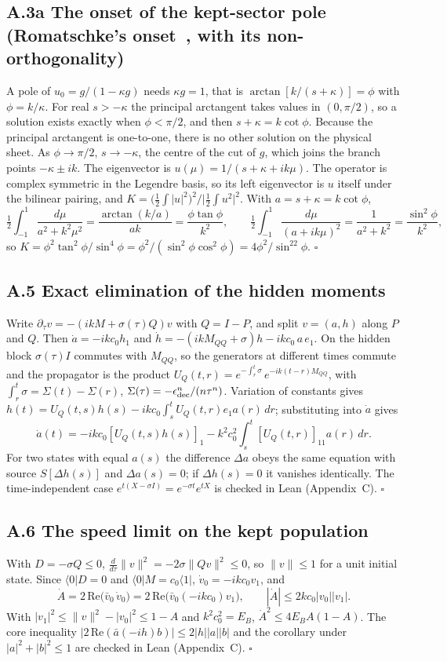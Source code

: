 \documentclass[11pt]{article}
\begin{document}
\subsection*{A.3a The onset of the kept-sector pole (Romatschke's onset~\cite[Eq.~(37)]{Rom}, with its non-orthogonality)}
A pole of $u_0=g/(1-\kappa g)$ needs $\kappa g=1$, that is $\arctan[k/(s+\kappa)]=\phi$ with $\phi=k/\kappa$. For real $s>-\kappa$ the principal arctangent takes values in $(0,\pi/2)$, so a solution exists exactly when $\phi<\pi/2$, and then $s+\kappa=k\cot\phi$. Because the principal arctangent is one-to-one, there is no other solution on the physical sheet. As $\phi\to\pi/2$, $s\to-\kappa$, the centre of the cut of $g$, which joins the branch points $-\kappa\pm ik$. The eigenvector is $u(\mu)=1/(s+\kappa+ik\mu)$. The operator is complex symmetric in the Legendre basis, so its left eigenvector is $u$ itself under the bilinear pairing, and $K=\big(\tfrac12\!\int|u|^2\big)^2/\big|\tfrac12\!\int u^2\big|^2$. With $a=s+\kappa=k\cot\phi$,
\[
\tfrac12\int_{-1}^{1}\frac{d\mu}{a^2+k^2\mu^2}=\frac{\arctan(k/a)}{ak}=\frac{\phi\tan\phi}{k^2},\qquad
\tfrac12\int_{-1}^{1}\frac{d\mu}{(a+ik\mu)^2}=\frac{1}{a^2+k^2}=\frac{\sin^2\phi}{k^2},
\]
so $K=\phi^2\tan^2\phi/\sin^4\phi=\phi^2/(\sin^2\phi\cos^2\phi)=4\phi^2/\sin^22\phi$. $\square$

\subsection*{A.5 Exact elimination of the hidden moments}
Write $\partial_\tau v=-(ikM+\sigma(\tau)Q)v$ with $Q=I-P$, and split $v=(a,h)$ along $P$ and $Q$. Then $\dot a=-ikc_0h_1$ and $\dot h=-(ikM_{QQ}+\sigma)h-ikc_0\,a\,e_1$. On the hidden block $\sigma(\tau)I$ commutes with $M_{QQ}$, so the generators at different times commute and the propagator is the product $U_Q(t,r)=e^{-\int_r^t\sigma}\,e^{-ik(t-r)M_{QQ}}$, with $\int_r^t\sigma=\Sigma(t)-\Sigma(r)$, $\Sigma(\tau)=-\epsilon_{\rm dec}^n/(n\tau^n)$. Variation of constants gives $h(t)=U_Q(t,s)h(s)-ikc_0\int_s^tU_Q(t,r)e_1a(r)\,dr$; substituting into $\dot a$ gives
\[
\dot a(t)=-ikc_0[U_Q(t,s)h(s)]_1-k^2c_0^2\int_s^t[U_Q(t,r)]_{11}a(r)\,dr .
\]
For two states with equal $a(s)$ the difference $\Delta a$ obeys the same equation with source $S[\Delta h(s)]$ and $\Delta a(s)=0$; if $\Delta h(s)=0$ it vanishes identically. The time-independent case $e^{t(X-\sigma I)}=e^{-\sigma t}e^{tX}$ is checked in Lean (Appendix~C). $\square$
\subsection*{A.6 The speed limit on the kept population}
With $D=-\sigma Q\le0$, $\frac{d}{d\tau}\lVert v\rVert^2=-2\sigma\lVert Qv\rVert^2\le0$, so $\lVert v\rVert\le1$ for a unit initial state. Since $\langle0|D=0$ and $\langle0|M=c_0\langle1|$, $\dot v_0=-ikc_0v_1$, and
\[
\dot A=2\,\mathrm{Re}\big(\bar v_0\,\dot v_0\big)=2\,\mathrm{Re}\big(\bar v_0(-ikc_0)v_1\big),\qquad |\dot A|\le2kc_0|v_0||v_1|.
\]
With $|v_1|^2\le\lVert v\rVert^2-|v_0|^2\le1-A$ and $k^2c_0^2=E_B$, $\dot A^2\le4E_BA(1-A)$. The core inequality $|2\,\mathrm{Re}(\bar a(-ih)b)|\le2|h||a||b|$ and the corollary under $|a|^2+|b|^2\le1$ are checked in Lean (Appendix~C). $\square$
\end{document}
